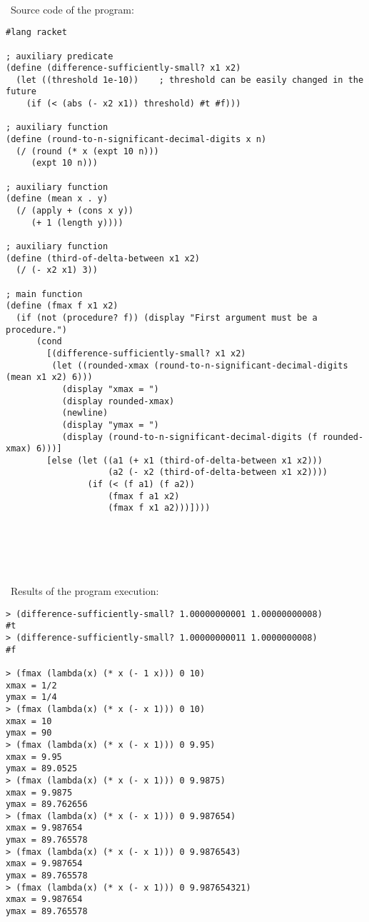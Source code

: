 \documentclass{article}
\begin{document}
\paragraph{}\
Source code of the program:

\begin{verbatim}
#lang racket

; auxiliary predicate
(define (difference-sufficiently-small? x1 x2)
  (let ((threshold 1e-10))    ; threshold can be easily changed in the future
    (if (< (abs (- x2 x1)) threshold) #t #f)))

; auxiliary function
(define (round-to-n-significant-decimal-digits x n)
  (/ (round (* x (expt 10 n)))
     (expt 10 n)))

; auxiliary function
(define (mean x . y)
  (/ (apply + (cons x y))
     (+ 1 (length y))))

; auxiliary function
(define (third-of-delta-between x1 x2)
  (/ (- x2 x1) 3))

; main function
(define (fmax f x1 x2)
  (if (not (procedure? f)) (display "First argument must be a procedure.")
      (cond
        [(difference-sufficiently-small? x1 x2)
         (let ((rounded-xmax (round-to-n-significant-decimal-digits (mean x1 x2) 6)))
           (display "xmax = ")
           (display rounded-xmax)
           (newline)
           (display "ymax = ")
           (display (round-to-n-significant-decimal-digits (f rounded-xmax) 6)))]
        [else (let ((a1 (+ x1 (third-of-delta-between x1 x2)))
                    (a2 (- x2 (third-of-delta-between x1 x2))))
                (if (< (f a1) (f a2))
                    (fmax f a1 x2)
                    (fmax f x1 a2)))])))
\end{verbatim}

\paragraph{}\
\paragraph{}\
\paragraph{}\
	Results of the program execution:
	
\begin{verbatim} 
> (difference-sufficiently-small? 1.00000000001 1.00000000008)
#t
> (difference-sufficiently-small? 1.00000000011 1.0000000008)
#f

> (fmax (lambda(x) (* x (- 1 x))) 0 10)
xmax = 1/2
ymax = 1/4
> (fmax (lambda(x) (* x (- x 1))) 0 10)
xmax = 10
ymax = 90
> (fmax (lambda(x) (* x (- x 1))) 0 9.95)
xmax = 9.95
ymax = 89.0525
> (fmax (lambda(x) (* x (- x 1))) 0 9.9875)
xmax = 9.9875
ymax = 89.762656
> (fmax (lambda(x) (* x (- x 1))) 0 9.987654)
xmax = 9.987654
ymax = 89.765578
> (fmax (lambda(x) (* x (- x 1))) 0 9.9876543)
xmax = 9.987654
ymax = 89.765578
> (fmax (lambda(x) (* x (- x 1))) 0 9.987654321)
xmax = 9.987654
ymax = 89.765578
\end{verbatim}
\end{document}
